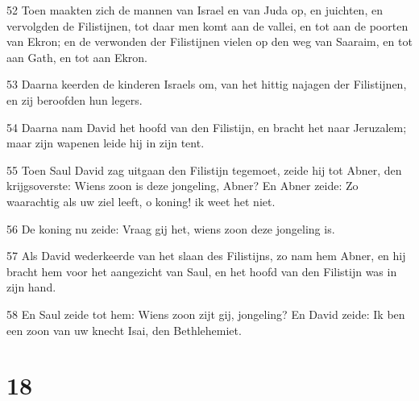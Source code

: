 \par 52 Toen maakten zich de mannen van Israel en van Juda op, en juichten, en vervolgden de Filistijnen, tot daar men komt aan de vallei, en tot aan de poorten van Ekron; en de verwonden der Filistijnen vielen op den weg van Saaraim, en tot aan Gath, en tot aan Ekron.
\par 53 Daarna keerden de kinderen Israels om, van het hittig najagen der Filistijnen, en zij beroofden hun legers.
\par 54 Daarna nam David het hoofd van den Filistijn, en bracht het naar Jeruzalem; maar zijn wapenen leide hij in zijn tent.
\par 55 Toen Saul David zag uitgaan den Filistijn tegemoet, zeide hij tot Abner, den krijgsoverste: Wiens zoon is deze jongeling, Abner? En Abner zeide: Zo waarachtig als uw ziel leeft, o koning! ik weet het niet.
\par 56 De koning nu zeide: Vraag gij het, wiens zoon deze jongeling is.
\par 57 Als David wederkeerde van het slaan des Filistijns, zo nam hem Abner, en hij bracht hem voor het aangezicht van Saul, en het hoofd van den Filistijn was in zijn hand.
\par 58 En Saul zeide tot hem: Wiens zoon zijt gij, jongeling? En David zeide: Ik ben een zoon van uw knecht Isai, den Bethlehemiet.

\chapter{18}

